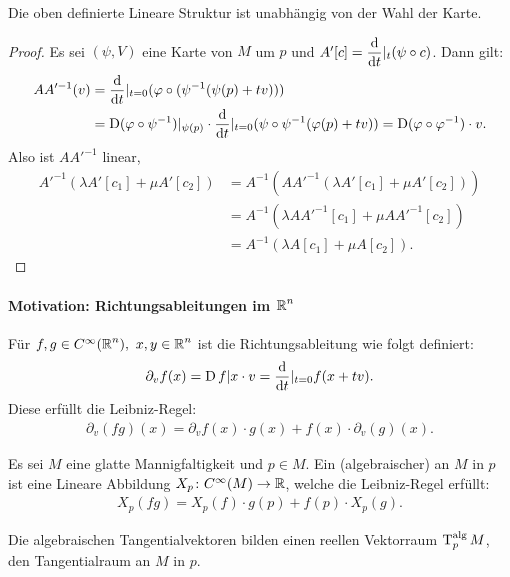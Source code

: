 \begin{lemma}
  Die oben definierte Lineare Struktur ist unabhängig von der Wahl der Karte.
\end{lemma}

\begin{proof}
  Es sei $(\psi, V)$ eine Karte von $M$ um $p$ und $A'[c] = \dfrac{\mathrm{d} }{\mathrm{d} t}|_t(\psi \circ c)$. Dann gilt:
  \begin{align*}
    A A'^{-1}(v) & = \dfrac{\mathrm{d} }{\mathrm{d} t}|_{t=0}(\varphi \circ (\psi^{-1} (\psi(p) + tv)))\\
    & = \operatorname{D}(\varphi \circ \psi^{-1})|_{\psi(p)} \cdot \dfrac{\mathrm{d} }{\mathrm{d} t}|_{t=0}(\psi \circ \psi^{-1}(\varphi(p) + tv)) = \operatorname{D} (\varphi \circ \varphi^{-1}) \cdot v.
  \end{align*}
  Also ist $A A'^{-1}$ linear,
  \begin{align*}
    A'^{-1}(\lambda A'[c_1] + \mu A'[c_2]) & = A^{-1}(A A'^{-1}(\lambda A'[c_1] + \mu A'[c_2]))\\
    & = A^{-1} (\lambda A A'^{-1}[c_1] + \mu A A'^{-1} [c_2])\\
    & = A^{-1}(\lambda A [c_1] + \mu A [c_2]).
  \end{align*}
\end{proof}



\paragraph{Motivation: Richtungsableitungen im $\operatorname{\mathbb{R}}^n$}\hfill
\begin{bem}
  
  Für $f,g \in C^{\infty}(\operatorname{\mathbb{R}}^n), \ x,y \in \operatorname{\mathbb{R}}^n$ ist die Richtungsableitung wie folgt definiert:
  \begin{align*}
    \partial_vf(x) = \operatorname{D} f|x \cdot v = \dfrac{\mathrm{d} }{\mathrm{d} t}|_{t=0}f(x+tv).
  \end{align*}
  Diese erfüllt die Leibniz-Regel:
  \begin{align*}
    \partial_v(fg)(x) = \partial_vf(x)\cdot g(x) + f(x) \cdot \partial_v(g)(x).
  \end{align*}
\end{bem}

\begin{dfn}
  Es sei $M$ eine glatte Mannigfaltigkeit und $p\in M$. Ein (algebraischer)  an $M$ in $p$ ist eine Lineare Abbildung $X_p \colon C^{\infty}(M) \to \operatorname{\mathbb{R}}$, welche die Leibniz-Regel erfüllt:
  \begin{align*}
    X_p(fg) = X_p(f) \cdot g(p) + f(p) \cdot X_p(g).
  \end{align*}

  Die algebraischen Tangentialvektoren bilden einen reellen Vektorraum $\operatorname{T}_p^{\text{alg}}M$, den Tangentialraum an $M$ in $p$.
\end{dfn}

